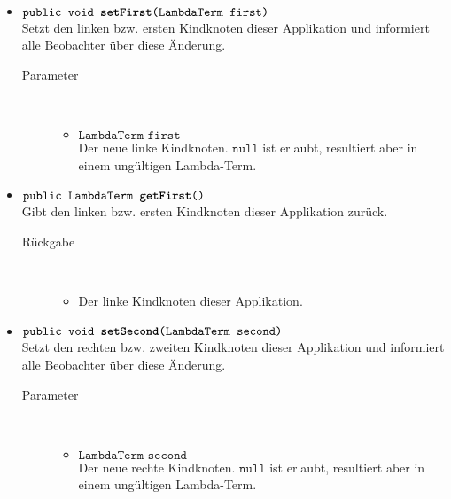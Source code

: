 \begin{description}
\begin{itemize}
		\item $\texttt{public void \textbf{setFirst}(LambdaTerm first)}$ \\ Setzt den linken bzw. ersten Kindknoten dieser Applikation und informiert alle Beobachter über diese Änderung.
		\begin{description}
			\item[Parameter] \hfill \\
			\vspace{-.8cm}
			\begin{itemize}
				\item $\texttt{LambdaTerm first}$ \\ Der neue linke Kindknoten. $\texttt{null}$ ist erlaubt, resultiert aber in einem ungültigen Lambda-Term.
			\end{itemize}
		\end{description}
		
		\item $\texttt{public LambdaTerm \textbf{getFirst}()}$ \\ Gibt den linken bzw. ersten Kindknoten dieser Applikation zurück.
		\begin{description}
			\item[Rückgabe] \hfill \\
			\vspace{-.8cm}
			\begin{itemize}
				\item  Der linke Kindknoten dieser Applikation.
			\end{itemize}
		\end{description}
		
		\item $\texttt{public void \textbf{setSecond}(LambdaTerm second)}$ \\ Setzt den rechten bzw. zweiten Kindknoten dieser Applikation und informiert alle Beobachter über diese Änderung.
		\begin{description}
			\item[Parameter] \hfill \\
			\vspace{-.8cm}
			\begin{itemize}
				\item $\texttt{LambdaTerm second}$ \\ Der neue rechte Kindknoten. $\texttt{null}$ ist erlaubt, resultiert aber in einem ungültigen Lambda-Term.
			\end{itemize}
		\end{description}
		

\end{itemize}
\end{description}

